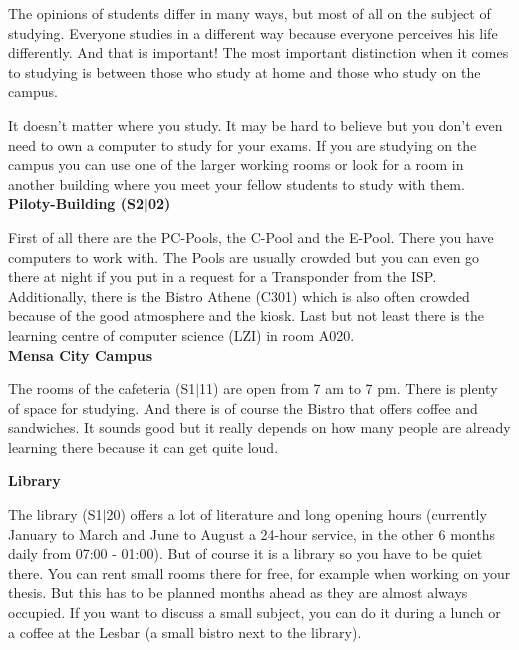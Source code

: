 {The opinions of students differ in many ways, but most of all on the subject of studying. Everyone studies in a different way because everyone perceives his life differently. And that is important! The most important distinction when it comes to studying is between those who study at home and those who study on the campus.
}{
    It doesn't matter where you study. It may be hard to believe but you don't even need to own a computer to study for your exams. If you are studying on the campus you can use one of the larger working rooms or look for a room in another building where you meet your fellow students to study with them.\\

    \noindent\textbf{Piloty-Building (S2$|$02)}

    First of all there are the PC-Pools, the C-Pool and the E-Pool. There you have computers to work with. The Pools are usually crowded but you can even go there at night if you put in a request for a Transponder from the ISP. Additionally, there is the Bistro Athene (C301) which is also often crowded because of the good atmosphere and the kiosk. Last but not least there is the learning centre of computer science (LZI) in room A020.\\

    \noindent\textbf{Mensa City Campus}

    The rooms of the cafeteria (S1$|$11) are open from 7 am to 7 pm. There is plenty of space for studying. And there is of course the Bistro that offers coffee and sandwiches. It sounds good but it really depends on how many people are already learning there because it can get quite loud.\\


    \noindent\textbf{Library}

    The library (S1$|$20) offers a lot of literature and long opening hours (currently January to March and June to August a 24-hour service, in the other 6 months daily from 07:00 - 01:00). But of course it is a library so you have to be quiet there. You can rent small rooms there for free, for example when working on your thesis. But this has to be planned months ahead as they are almost always occupied. If you want to discuss a small subject, you can do it during a lunch or a coffee at the Lesbar (a small bistro next to the library).\\

}
